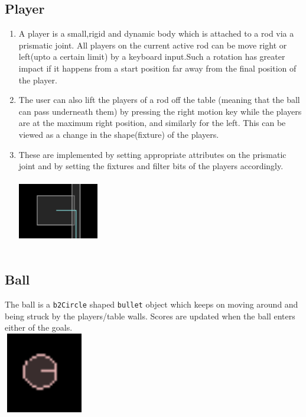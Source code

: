 \documentclass{article}
\begin{document}
\subsection{Player}
\begin{enumerate}
\item A player is a small,rigid and dynamic body which is attached to a rod via a prismatic joint. All players on the current active rod can be move right or left(upto a certain limit) by a keyboard input.Such a rotation has greater impact if it happens from a start position far away from the final position of the player.

\item The user can also lift the players of a rod off the table (meaning that the ball can pass underneath them) by pressing the right motion key while the players are at the maximum right position, and similarly for the left. This can be viewed as a change in the shape(fixture) of the players.

\item These are implemented by setting appropriate attributes on the prismatic joint and by setting the fixtures and filter bits of the players accordingly.\\
 \includegraphics[width=100pt,height=100pt]{Player}
\end{enumerate}
\subsection{Ball}
The ball is a \texttt{b2Circle} shaped \texttt{bullet} object which keeps on moving around and being struck by the players/table walls. Scores are updated when the ball enters either of the goals.\\
\includegraphics[width=100pt,height=100pt]{Ball}
\end{document}
